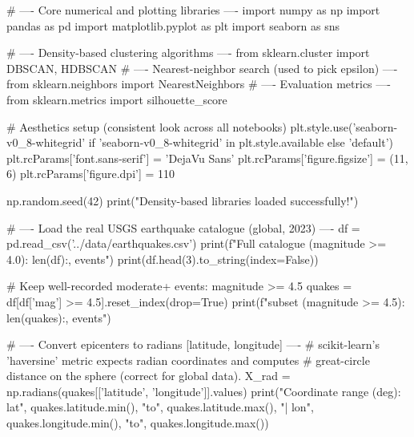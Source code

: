 
\begin{codebox}[title={Core numerical and plotting libraries}]
# ---- Core numerical and plotting libraries ----
import numpy as np
import pandas as pd
import matplotlib.pyplot as plt
import seaborn as sns

# ---- Density-based clustering algorithms ----
from sklearn.cluster import DBSCAN, HDBSCAN
# ---- Nearest-neighbor search (used to pick epsilon) ----
from sklearn.neighbors import NearestNeighbors
# ---- Evaluation metrics ----
from sklearn.metrics import silhouette_score

# Aesthetics setup (consistent look across all notebooks)
plt.style.use('seaborn-v0_8-whitegrid' if 'seaborn-v0_8-whitegrid' in plt.style.available else 'default')
plt.rcParams['font.sans-serif'] = 'DejaVu Sans'
plt.rcParams['figure.figsize'] = (11, 6)
plt.rcParams['figure.dpi'] = 110

np.random.seed(42)
print("Density-based libraries loaded successfully!")
\end{codebox}

\begin{codebox}[title={Load the real USGS earthquake catalogue (global, 2023)}]
# ---- Load the real USGS earthquake catalogue (global, 2023) ----
df = pd.read_csv('../data/earthquakes.csv')
print(f"Full catalogue (magnitude >= 4.0): {len(df):,} events")
print(df.head(3).to_string(index=False))

# Keep well-recorded moderate+ events: magnitude >= 4.5
quakes = df[df['mag'] >= 4.5].reset_index(drop=True)
print(f"\nAnalysed subset (magnitude >= 4.5): {len(quakes):,} events")

# ---- Convert epicenters to radians [latitude, longitude] ----
# scikit-learn's 'haversine' metric expects radian coordinates and computes
# great-circle distance on the sphere (correct for global data).
X_rad = np.radians(quakes[['latitude', 'longitude']].values)
print("Coordinate range (deg): lat", quakes.latitude.min(), "to", quakes.latitude.max(),
      "| lon", quakes.longitude.min(), "to", quakes.longitude.max())
\end{codebox}

